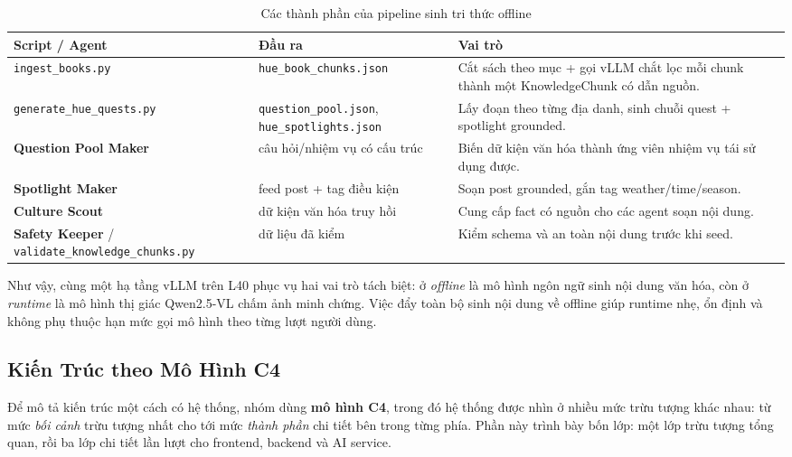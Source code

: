 \begin{table}[H]
\centering
\caption{Các thành phần của pipeline sinh tri thức offline}
\label{tab:offline_agents}
\begin{tabularx}{\textwidth}{>{\raggedright\arraybackslash}p{4.0cm} >{\raggedright\arraybackslash}p{3.6cm} X}
\toprule
\textbf{Script / Agent} & \textbf{Đầu ra} & \textbf{Vai trò} \\
\midrule
\texttt{ingest\_books.py} & \texttt{hue\_book\_chunks.json} & Cắt sách theo mục + gọi vLLM chắt lọc mỗi chunk thành một KnowledgeChunk có dẫn nguồn. \\
\texttt{generate\_hue\_quests.py} & \texttt{question\_pool.json}, \texttt{hue\_spotlights.json} & Lấy đoạn theo từng địa danh, sinh chuỗi quest + spotlight grounded. \\
\textbf{Question Pool Maker} & câu hỏi/nhiệm vụ có cấu trúc & Biến dữ kiện văn hóa thành ứng viên nhiệm vụ tái sử dụng được. \\
\textbf{Spotlight Maker} & feed post + tag điều kiện & Soạn post grounded, gắn tag weather/time/season. \\
\textbf{Culture Scout} & dữ kiện văn hóa truy hồi & Cung cấp fact có nguồn cho các agent soạn nội dung. \\
\textbf{Safety Keeper} / \texttt{validate\_knowledge\_chunks.py} & dữ liệu đã kiểm & Kiểm schema và an toàn nội dung trước khi seed. \\
\bottomrule
\end{tabularx}
\end{table}

Như vậy, cùng một hạ tầng vLLM trên L40 phục vụ hai vai trò tách biệt: ở
\textit{offline} là mô hình ngôn ngữ sinh nội dung văn hóa, còn ở
\textit{runtime} là mô hình thị giác Qwen2.5-VL chấm ảnh minh chứng. Việc đẩy
toàn bộ sinh nội dung về offline giúp runtime nhẹ, ổn định và không phụ thuộc
hạn mức gọi mô hình theo từng lượt người dùng.

\subsection{Kiến Trúc theo Mô Hình C4}
\contrib

Để mô tả kiến trúc một cách có hệ thống, nhóm dùng \textbf{mô hình C4},
trong đó hệ thống được nhìn ở nhiều mức trừu tượng khác nhau: từ mức
\textit{bối cảnh} trừu tượng nhất cho tới mức \textit{thành phần} chi tiết
bên trong từng phía. Phần này trình bày bốn lớp: một lớp trừu tượng tổng
quan, rồi ba lớp chi tiết lần lượt cho frontend, backend và AI service.

